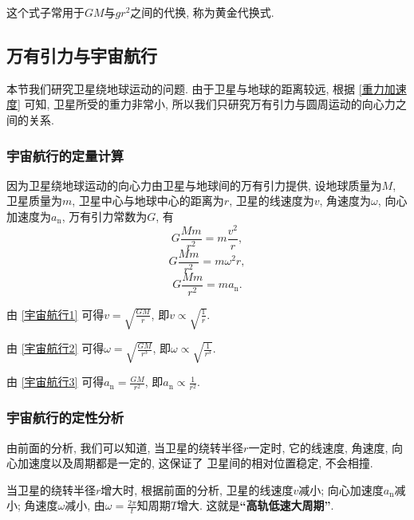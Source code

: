 \documentclass[11pt,a4paper]{ctexart}
\begin{document}
这个式子常用于$GM$与$gr^2$之间的代换, 称为黄金代换式.

\subsection{万有引力与宇宙航行}

本节我们研究卫星绕地球运动的问题.
由于卫星与地球的距离较远, 根据 \eqref{重力加速度} 可知, 卫星所受的重力非常小,
所以我们只研究万有引力与圆周运动的向心力之间的关系.

\subsubsection{宇宙航行的定量计算}

因为卫星绕地球运动的向心力由卫星与地球间的万有引力提供, 设地球质量为$M$, 卫星质量为$m$,
卫星中心与地球中心的距离为$r$, 卫星的线速度为$v$, 角速度为$\omega$, 向心加速度为$a_\mathrm{n}$,
万有引力常数为$G$, 有
\begin{equation}
	G\frac{Mm}{r^2} = m\frac{v^2}{r},
	\label{宇宙航行1}
\end{equation}
\begin{equation}
	G\frac{Mm}{r^2} = m\omega^2 r,
	\label{宇宙航行2}
\end{equation}
\begin{equation}
	G\frac{Mm}{r^2} = ma_\mathrm{n}.
	\label{宇宙航行3}
\end{equation}

由 \eqref{宇宙航行1} 可得$v = \sqrt{\displaystyle\frac{GM}{r}}$, 即$v\propto \sqrt{\displaystyle\frac1r}$.\par\vspace{8pt}
由 \eqref{宇宙航行2} 可得$\omega = \sqrt{\displaystyle\frac{GM}{r^3}}$, 即$\omega \propto \sqrt{\displaystyle\frac{1}{r^3}}$.\par\vspace{8pt}
由 \eqref{宇宙航行3} 可得$a_\mathrm{n} = \displaystyle\frac{GM}{r^2}$, 即$a_\mathrm{n}\propto \displaystyle\frac{1}{r^2}$.

\subsubsection{宇宙航行的定性分析}

由前面的分析, 我们可以知道, 当卫星的绕转半径$r$一定时, 它的线速度, 角速度, 向心加速度以及周期都是一定的, 这保证了
卫星间的相对位置稳定, 不会相撞.

当卫星的绕转半径$r$增大时, 根据前面的分析, 卫星的线速度$v$减小; 向心加速度$a_\mathrm{n}$减小; 角速度$\omega$减小,
由$\omega = \displaystyle\frac{2\pi}{t}$知周期$T$增大. 这就是\textbf{``高轨低速大周期''}.
\end{document}
